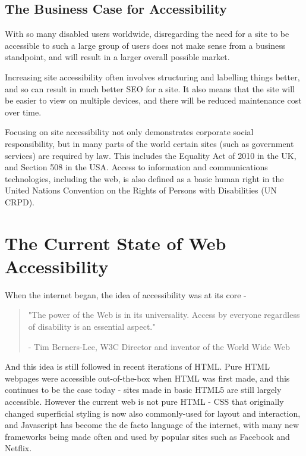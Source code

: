 \documentclass[ %
                    author={Aleena Baig},
                supervisor={Dr Simon Lock},
                    degree={BSc},
                     title={On Making Web Accessible Graphs},
                  subtitle={},
                      year={2019} ]{dissertation}
\begin{document}
\subsection{The Business Case for Accessibility}

With so many disabled users worldwide, disregarding the need for a site to be accessible to such a large group of users does not make sense from a business standpoint, and will result in a larger overall possible market.

Increasing site accessibility often involves structuring and labelling things better, and so can result in much better SEO for a site. It also means that the site will be easier to view on multiple devices, and there will be reduced maintenance cost over time.\cite{WAIaccessibilityintro}

Focusing on site accessibility not only demonstrates corporate social responsibility, but in many parts of the world certain sites (such as government services) are required by law. This includes the Equality Act of 2010 in the UK, and Section 508 in the USA. Access to information and communications technologies, including the web, is also defined as a basic human right in the United Nations Convention on the Rights of Persons with Disabilities (UN CRPD). \cite{accessibilityUN}

\section{The Current State of Web Accessibility}

When the internet began, the idea of accessibility was at its core -

\begin{quote}
\centering
"The power of the Web is in its universality. Access by everyone regardless of disability is an essential aspect."

- Tim Berners-Lee, W3C Director and inventor of the World Wide Web
\end{quote}
%
And this idea is still followed in recent iterations of HTML. Pure HTML webpages were accessible out-of-the-box when HTML was first made, and this continues to be the case today - sites made in basic HTML5 are still largely accessible. However the current web is not pure HTML - CSS that originally changed superficial styling is now also commonly-used for layout and interaction, and Javascript has become the de facto language of the internet, with many new frameworks being made often and used by popular sites such as Facebook and Netflix.
\end{document}
